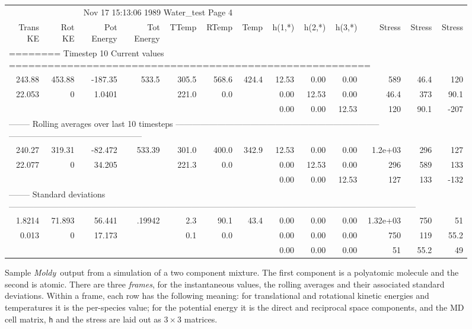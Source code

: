 \documentclass[twoside]{report}
\newcommand{\moldy}{{\em Moldy}}
\begin{document}
\begin{figure}
\caption[Sample \moldy\  output.]{Sample \moldy\  output from a simulation 
of a two component mixture.  The first component is a polyatomic
molecule and the second is atomic.  There are three {\em frames}, for
the instantaneous values, the rolling averages and their associated
standard deviations.  Within a frame, each row has the following
meaning: for translational and rotational kinetic energies and
temperatures it is the per-species value; for the potential energy it
is the direct and reciprocal space components, and the MD cell matrix,
{\tt h} and the stress are laid out as $3\times 3$ matrices.}
\label{fig:output}
\tiny
%
\begin{tabular}{rrrrrrrr
@{\hspace{1em}}r@{\hspace{1em}}rr@{\hspace{1em}}r@{\hspace{1em}}r}
\multicolumn{6}{r}{\hfill Nov 17 15:13:06 1989 \hfill Water\_test
\hfill Page 4} & & & & & & &\\
Trans KE & Rot KE & Pot Energy & Tot Energy & TTemp & RTemp & Temp &
h(1,*) & h(2,*) & h(3,*) & Stress & Stress & Stress \\
\multicolumn{13}{l}{======== Timestep 10      Current values
======================================================== } \\
243.88 & 453.88  & -187.35  & 533.5  & 305.5  & 568.6  & 424.4  &
12.53  & 0.00  & 0.00  & 589  & 46.4  & 120 \\
22.053  & 0  & 1.0401 & & 221.0  & 0.0 & & 0.00  & 12.53  & 0.00  & 46.4
& 373  & 90.1 \\
 &  &  &  &  & & &  0.00  & 0.00  & 12.53 & 120  & 90.1  & -207 \\
\multicolumn{13}{l}{-------- Rolling averages over last 10 timesteps
--------------------------------------------------------------------------
------------------------------------------------
} \\
240.27 & 319.31 & -82.472 & 533.39 & 301.0 & 400.0 & 342.9 & 12.53 &
0.00 & 0.00 & 1.2e+03 & 296 & 127 \\
22.077 & 0 & 34.205  & & 221.3 & 0.0 & & 0.00 & 12.53 & 0.00 & 296 &
589 & 133 \\
& & & & & & & 0.00 & 0.00 & 12.53 & 127 & 133 & -132 \\
\multicolumn{13}{l}{-------- Standard deviations
---------------------------------------------------------------------------------------------------------------------------------------------------
} \\
1.8214 & 71.893 & 56.441 &.19942 & 2.3 & 90.1 & 43.4 & 0.00 & 0.00 &
0.00 & 1.32e+03 & 750 & 51 \\
0.013 & 0 & 17.173 & & 0.1 & 0.0 & & 0.00 & 0.00 & 0.00 & 750 & 119 & 55.2 \\
 & & &  &  &  &  & 0.00  & 0.00 & 0.00 & 51 & 55.2 & 49 \\
\end{tabular}
\end{figure}
\end{document}
